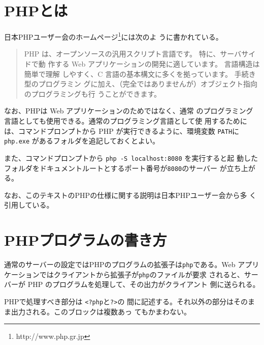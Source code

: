\section{PHPとは}
日本PHPユーザー会のホームページ\footnote{http://www.php.gr.jp}には次のよ
うに書かれている。
\begin{quotation}
PHP は、オープンソースの汎用スクリプト言語です。 特に、サーバサイドで動
 作する Web アプリケーションの開発に適しています。 言語構造は簡単で理解
 しやすく、C 言語の基本構文に多くを拠っています。 手続き型のプログラミン
 グに加え、（完全ではありませんが）オブジェクト指向のプログラミングも行
 うことができます。
\end{quotation}
なお、PHPは Web アプリケーションのためではなく、通常
のプログラミング言語としても使用できる。通常のプログラミング言語として使
用するためには、コマンドプロンプトから PHP が実行できるように、環境変数
\texttt{PATH}に \texttt{php.exe} があるフォルダを追記しておくとよい。

また、コマンドプロンプトから \Verb+php -S localhost:8080+ を実行すると起
動したフォルダをドキュメントルートとするポート番号が\Verb+8080+のサーバー
が立ち上がる。

なお、このテキストのPHPの仕様に関する説明は日本PHPユーザー会から多
く引用している。

\section{PHPプログラムの書き方}
通常のサーバーの設定ではPHPのプログラムの拡張子は\texttt{php}である。Web
アプリケーションではクライアントから拡張子が\texttt{php}のファイルが要求
されると、サーバーが PHP のプログラムを処理して、その出力がクライアント
側に送られる。

PHPで処理すべき部分は \texttt{<?php}と\texttt{?>}の
間に記述する。それ以外の部分はそのまま出力される。このブロックは複数あっ
てもかまわない。
